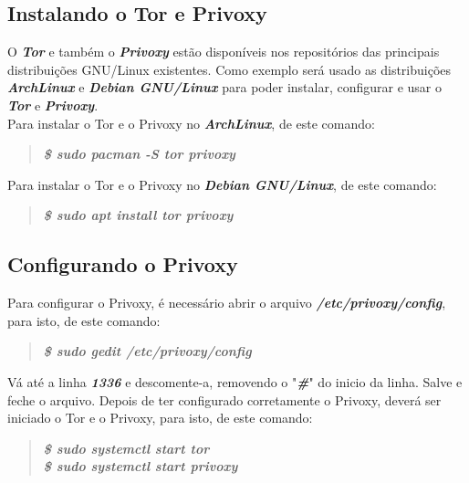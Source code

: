 \documentclass[12pt, letterpaper, DejaVuSansMono:12]{report}
\begin{document}
\subsection{Instalando o Tor e Privoxy}
	O \textit{\textbf{Tor}} e também o \textit{\textbf{Privoxy}} estão disponíveis nos repositórios das principais distribuições GNU/Linux existentes. Como exemplo será usado as distribuições \textit{\textbf{ArchLinux}} e \textit{\textbf{Debian GNU/Linux}} para poder instalar, configurar e usar o \textit{\textbf{Tor}} e \textit{\textbf{Privoxy}}.\\

Para instalar o Tor e o Privoxy no \textit{\textbf{ArchLinux}}, de este comando:\\

\begin{quote}
	\textit{\textbf{\$ sudo pacman -S tor privoxy}}\\
\end{quote}

Para instalar o Tor e o Privoxy no \textit{\textbf{Debian GNU/Linux}}, de este comando:\\

\begin{quote}
	\textit{\textbf{\$ sudo apt install tor privoxy}}\\
\end{quote}

\subsection{Configurando o Privoxy}
	Para configurar o Privoxy, é necessário abrir o arquivo \textit{\textbf{/etc/privoxy/config}}, para isto, de este comando:\\

\begin{quote}
	\textit{\textbf{\$ sudo gedit /etc/privoxy/config}}\\
\end{quote}

	Vá até a linha \textit{\textbf{1336}} e descomente-a, removendo o "\textit{\textbf{\#}}" do inicio da linha. Salve e feche o arquivo. Depois de ter configurado corretamente o Privoxy, deverá ser iniciado o Tor e o Privoxy, para isto, de este comando:\\

\begin{quote}
	\textit{\textbf{\$ sudo systemctl start tor}}\\
	\textit{\textbf{\$ sudo systemctl start privoxy}}\\
\end{quote}
\end{document}
